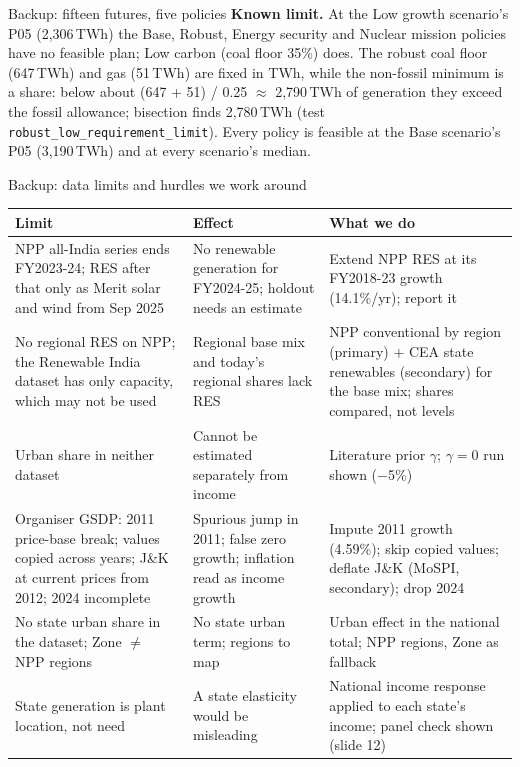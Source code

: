 \documentclass[aspectratio=169,10pt,t]{beamer}
\begin{document}
\begin{frame}[label=b3]{Backup: fifteen futures, five policies}
{\textbf{Known limit.} At the Low growth scenario's P05 (2,306\,TWh) the Base, Robust, Energy security and Nuclear mission policies have no feasible plan; Low carbon (coal floor 35\%) does. The robust coal floor (647\,TWh) and gas (51\,TWh) are fixed in TWh, while the non-fossil minimum is a share: below about (647 + 51) / 0.25 $\approx$ 2,790\,TWh of generation they exceed the fossil allowance; bisection finds 2,780\,TWh (test \texttt{robust\_low\_requirement\_limit}). Every policy is feasible at the Base scenario's P05 (3,190\,TWh) and at every scenario's median.}
\end{frame}

\begin{frame}[label=b4]{Backup: data limits and hurdles we work around}
{\fontsize{7.0}{8.3}\selectfont
\renewcommand{\arraystretch}{1.08}
\begin{tabular}{@{}>{\raggedright\arraybackslash}p{4.8cm}>{\raggedright\arraybackslash}p{4.1cm}>{\raggedright\arraybackslash}p{4.8cm}@{}}
\toprule
Limit & Effect & What we do\\
\midrule
NPP all-India series ends FY2023-24; RES after that only as Merit solar and wind from Sep 2025 & No renewable generation for FY2024-25; holdout needs an estimate & Extend NPP RES at its FY2018-23 growth (14.1\%/yr); report it\\
No regional RES on NPP; the Renewable India dataset has only capacity, which may not be used & Regional base mix and today's regional shares lack RES & NPP conventional by region (primary) + CEA state renewables (secondary) for the base mix; shares compared, not levels\\
Urban share in neither dataset & Cannot be estimated separately from income & Literature prior $\gamma$; $\gamma = 0$ run shown ($-$5\%)\\
Organiser GSDP: 2011 price-base break; values copied across years; J\&K at current prices from 2012; 2024 incomplete & Spurious jump in 2011; false zero growth; inflation read as income growth & Impute 2011 growth (4.59\%); skip copied values; deflate J\&K (MoSPI, secondary); drop 2024\\
No state urban share in the dataset; Zone $\neq$ NPP regions & No state urban term; regions to map & Urban effect in the national total; NPP regions, Zone as fallback\\
State generation is plant location, not need & A state elasticity would be misleading & National income response applied to each state's income; panel check shown (slide 12)\\

\end{tabular}}
\end{frame}
\end{document}
